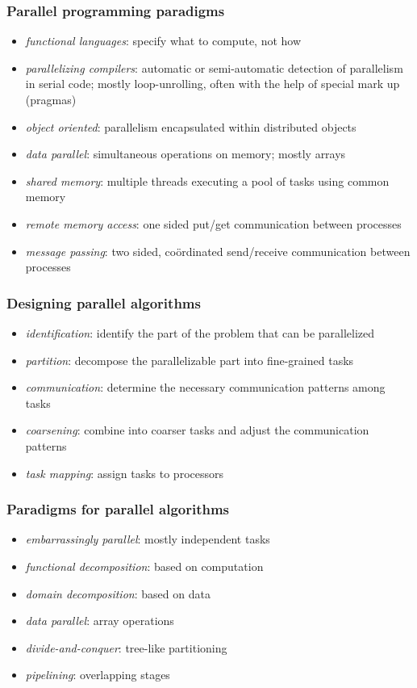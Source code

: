 \begin{frame}[fragile]
%
  \frametitle{Parallel programming paradigms}
%
  \begin{itemize}
%
  \item {\em functional languages}: specify what to compute, not how
  \item {\em parallelizing compilers}: automatic or semi-automatic detection of parallelism in
    serial code; mostly loop-unrolling, often with the help of special mark up (pragmas)
  \item {\em object oriented}: parallelism encapsulated within distributed objects

  \item {\em data parallel}: simultaneous operations on memory; mostly arrays
  \item {\em shared memory}: multiple threads executing a pool of tasks using common memory
  \item {\em remote memory access}: one sided put/get communication between processes
  \item {\em message passing}: two sided, co\"ordinated send/receive communication between
    processes
%
  \end{itemize}
%
\end{frame}

\begin{frame}[fragile]
%
  \frametitle{Designing parallel algorithms}
%
  \begin{itemize}
%
  \item {\em identification}: identify the part of the problem that can be parallelized
  \item {\em partition}: decompose the parallelizable part into fine-grained tasks
  \item {\em communication}: determine the necessary communication patterns among tasks
  \item {\em coarsening}: combine into coarser tasks and adjust the communication patterns
  \item {\em task mapping}: assign tasks to processors
%
  \end{itemize}
%
\end{frame}

\begin{frame}[fragile]
%
  \frametitle{Paradigms for parallel algorithms}
%
  \begin{itemize}
%
  \item {\em embarrassingly parallel}: mostly independent tasks
  \item {\em functional decomposition}: based on computation
  \item {\em domain decomposition}: based on data
  \item {\em data parallel}: array operations
  \item {\em divide-and-conquer}: tree-like partitioning
  \item {\em pipelining}: overlapping stages
%
  \end{itemize}
%
\end{frame}

